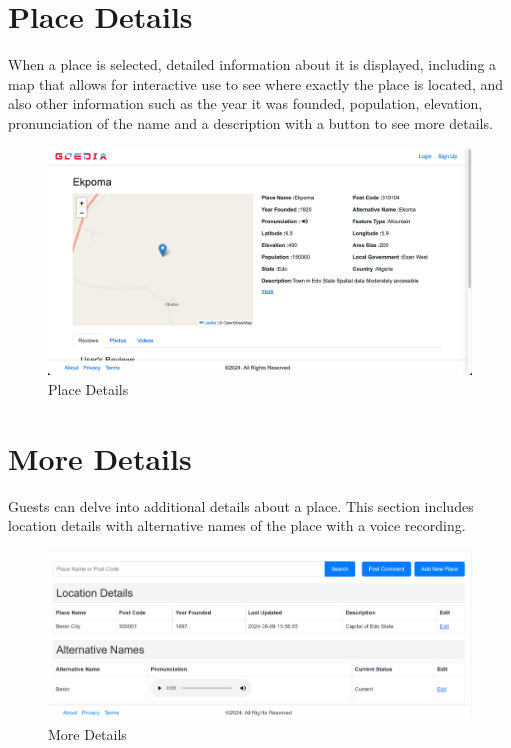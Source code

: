 \section{Place Details}
When a place is selected, detailed information about it is displayed, including a map that allows for interactive use to see where exactly the place is located, and also other information such as the year it was founded, population, elevation, pronunciation of the name and a description with a button to see more details. 

\begin{figure}[H]
    \centering
    \includegraphics[width=\textwidth]{placeDetails.png}
    \caption{Place Details}
    \label{fig:placeDetails}
\end{figure}

\section{More Details}
Guests can delve into additional details about a place. This section includes location details with alternative names of the place with a voice recording.

\begin{figure}[H]
    \centering
    \includegraphics[width=\textwidth]{moreDetails.png}
    \caption{More Details}
    \label{fig:moreDetails}
\end{figure}

